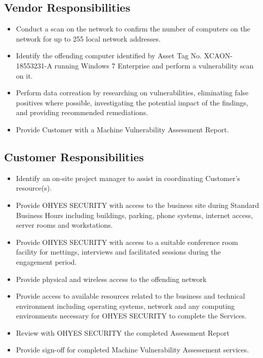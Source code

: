 \documentclass[11pt, oneside]{article}   	%
\begin{document}
\subsection{Vendor Responsibilities}
\begin{itemize}
\item{
	Conduct a scan on the network to confirm the number of computers
	on the network for up to 255 local network addresses.
}
\item{
	Identify the offending computer identified by Asset Tag No.
	XCAON-18553231-A running Windows 7 Enterprise and perform
	a vulnerability scan on it.
}
\item {
	Perform data correation by researching on vulnerabilities,
	eliminating false positives where possible, investigating
	the potential impact of the findings, and providing recommended
	remediations.
}
\item{
	Provide Customer with a Machine Vulnerability Assessment Report.
}
\end{itemize}
\subsection{Customer Responsibilities}
\begin{itemize}
\item {
	Identify an on-site project manager to assist in coordinating 
	Customer's resource(s).
}
\item{
	Provide OHYES SECURITY with access to the business site during
	Standard Business Hours including buildings, parking, phone systems,
	internet access, server rooms and workstations.
}
\item{
	Provide OHYES SECURITY with access to a suitable conference room 
	facility for mettings, interviews and facilitated sessions during 
	the engagement period.
}
\item{
	Provide physical and wireless access to the offending network
}
\item{
	Provide access to available resources related to the business
	and technical environment including operating systems, network
	and any computing environments necessary for OHYES SECURITY to
	complete the Services.
}
\item{
	Review with OHYES SECURITY the completed Assessment Report
}
\item{
	Provide sign-off for completed Machine Vulnerability Assessement
	services.
}

\end{itemize}
\end{document}
